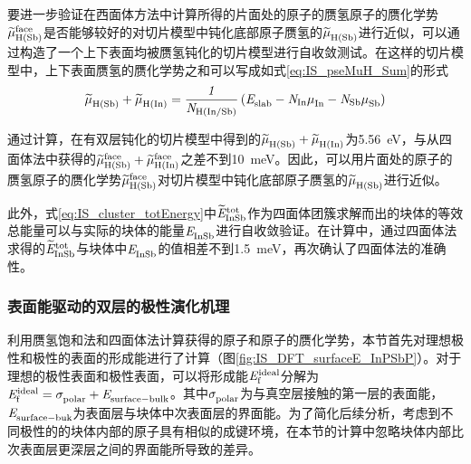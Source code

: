 要进一步验证在西面体方法中计算所得的片面处的原子的赝氢原子的赝化学势$\it \widetilde{\mu}_{\rm H\left(Sb\right)}^{\rm face} \it$是否能够较好的对切片模型中钝化底部原子赝氢的$\it \widetilde{\mu}_{\rm H\left(Sb\right)}^{\rm } \it$进行近似，可以通过构造了一个上下表面均被赝氢钝化的切片模型进行自收敛测试。在这样的切片模型中，上下表面赝氢的赝化学势之和可以写成如式\eqref{eq:IS_pseMuH_Sum}的形式\chinesecolon
\begin{equation}
    \label{eq:IS_pseMuH_Sum}
    \it \widetilde{\mu}_{\rm H\left(Sb\right)}^{\rm } \it+\it \widetilde{\mu}_{\rm H\left(In\right)}^{\rm } \it=\frac{1}{N_{\rm H \left(In/ Sb\right)}} \left(\it E_{\rm slab}^{\rm } \it-N_{\rm In}\it \mu_{\rm In}^{\rm } \it-N_{\rm Sb}\it \mu_{\rm Sb}^{\rm } \it\right)
\end{equation}

通过计算，在有双层钝化的切片模型中得到的$\it \widetilde{\mu}_{\rm H\left(Sb\right)}^{\rm } \it+\it \widetilde{\mu}_{\rm H\left(In\right)}^{\rm } \it$为\SI{5.56}{\electronvolt}，与从四面体法中获得的$\it \widetilde{\mu}_{\rm H\left(Sb\right)}^{\rm face} \it+\it \widetilde{\mu}_{\rm H\left(In\right)}^{\rm face} \it$之差不到\SI{10}{\milli\electronvolt}。因此，可以用片面处的原子的赝氢原子的赝化学势$\it \widetilde{\mu}_{\rm H\left(Sb\right)}^{\rm face} \it$对切片模型中钝化底部原子赝氢的$\it \widetilde{\mu}_{\rm H\left(Sb\right)}^{\rm } \it$进行近似。

此外，式\eqref{eq:IS_cluster_totEnergy}中$\it \widetilde{E}_{\rm InSb}^{\rm tot} \it$作为四面体团簇求解而出的块体的等效总能量可以与实际的块体的能量$\it E_{\rm InSb}^{\rm } \it$进行自收敛验证。在计算中，通过四面体法求得的$\it \widetilde{E}_{\rm InSb}^{\rm tot} \it$与块体中$\it E_{\rm InSb}^{\rm } \it$的值相差不到\SI{1.5}{\milli\electronvolt}，再次确认了四面体法的准确性。

\subsubsection{表面能驱动的双层的极性演化机理}

利用赝氢饱和法和四面体法计算获得的原子和原子的赝化学势，本节首先对理想极性和极性的表面的形成能进行了计算（图\ref{fig:IS_DFT_surfaceE_InPSbP}）。对于理想的极性表面和极性表面，可以将形成能$\it E_{\rm f}^{\rm ideal} \it$分解为$\it E_{\rm f}^{\rm ideal} \it=\it \sigma_{\rm polar}^{\rm } \it+\it E_{\rm surface-bulk}^{\rm } \it$。其中$\it \sigma_{\rm polar}^{\rm } \it$为与真空层接触的第一层的表面能，$\it E_{\rm surface-buk}^{\rm } \it$为表面层与块体中次表面层的界面能。为了简化后续分析，考虑到不同极性的的块体内部的原子具有相似的成键环境，在本节的计算中忽略块体内部比次表面层更深层之间的界面能所导致的差异。

